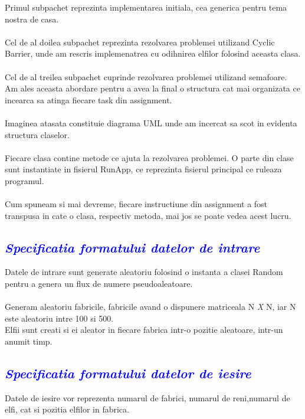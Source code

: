 \documentclass{article}
\begin{document}
Primul subpachet reprezinta implementarea initiala, cea generica pentru tema nostra de casa.\\\\ Cel de al doilea subpachet reprezinta rezolvarea problemei utilizand Cyclic Barrier, unde am rescris implemenatrea cu odihnirea elfilor folosind aceasta clasa.\\\\
Cel de al treilea subpachet cuprinde rezolvarea problemei utilizand semafoare.
Am ales aceasta abordare pentru a avea la final o structura cat mai organizata ce incearca sa atinga fiecare task din assignment.\\\\
Imaginea atasata constituie diagrama UML unde am incercat sa scot in evidenta structura claselor.\\\\ Fiecare clasa contine metode ce ajuta la rezolvarea problemei. O parte din clase sunt instantiate in fisierul RunApp, ce reprezinta fisierul principal ce ruleaza programul.\\\\ Cum spuneam si mai devreme, fiecare instructiune din assignment a fost transpusa in cate o clasa, respectiv metoda, mai jos se poate vedea acest lucru.
\vspace{7mm}
\newpage
\textcolor{blue}{\subsection{\itshape \textcolor{blue}{Specificatia formatului datelor de intrare}}}
\vspace{7mm}
Datele de intrare sunt generate aleatoriu folosind o instanta a clasei Random pentru a genera un flux de numere pseudoaleatoare.\\\\
Generam aleatoriu fabricile, fabricile avand o dispunere matriceala N \emph{X} N, iar N este aleatoriu intre 100 si 500.\\Elfii sunt creati si ei aleator in fiecare fabrica intr-o pozitie aleatoare, intr-un anumit timp.
\vspace{7mm}
\textcolor{blue}{\subsection{\itshape \textcolor{blue}{Specificatia formatului datelor de iesire}}}
\vspace{7mm}
Datele de iesire vor reprezenta numarul de fabrici, numarul de reni,numarul de elfi, cat si pozitia elfilor in fabrica.\\
\end{document}

